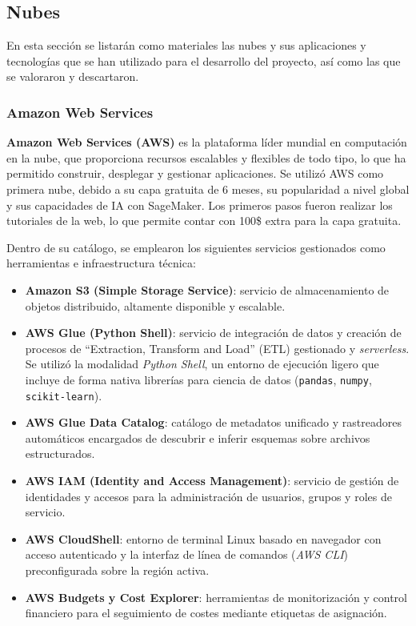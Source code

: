 \subsection{Nubes}

En esta sección se listarán como materiales las nubes y sus aplicaciones y tecnologías que se han utilizado para el desarrollo del proyecto, así como las que se valoraron y descartaron.

\subsubsection{Amazon Web Services}

\textbf{Amazon Web Services (AWS)} es la plataforma líder mundial en computación en la nube, que proporciona recursos escalables y flexibles de todo tipo, lo que ha permitido construir, desplegar y gestionar aplicaciones. Se utilizó AWS como primera nube, debido a su capa gratuita de 6 meses, su popularidad a nivel global y sus capacidades de IA con SageMaker. Los primeros pasos fueron realizar los tutoriales de la web, lo que permite contar con 100\$ extra para la capa gratuita.

Dentro de su catálogo, se emplearon los siguientes servicios gestionados como herramientas e infraestructura técnica:

\begin{itemize}
	\item \textbf{Amazon S3 (Simple Storage Service)}: servicio de almacenamiento de objetos distribuido, altamente disponible y escalable.
	\item \textbf{AWS Glue (Python Shell)}: servicio de integración de datos y creación de procesos de ``Extraction, Transform and Load'' (ETL) gestionado y \textit{serverless}. Se utilizó la modalidad \textit{Python Shell}, un entorno de ejecución ligero que incluye de forma nativa librerías para ciencia de datos (\texttt{pandas}, \texttt{numpy}, \texttt{scikit-learn}).
	\item \textbf{AWS Glue Data Catalog}: catálogo de metadatos unificado y rastreadores automáticos encargados de descubrir e inferir esquemas sobre archivos estructurados.
	\item \textbf{AWS IAM (Identity and Access Management)}: servicio de gestión de identidades y accesos para la administración de usuarios, grupos y roles de servicio.
	\item \textbf{AWS CloudShell}: entorno de terminal Linux basado en navegador con acceso autenticado y la interfaz de línea de comandos (\textit{AWS CLI}) preconfigurada sobre la región activa.
	\item \textbf{AWS Budgets y Cost Explorer}: herramientas de monitorización y control financiero para el seguimiento de costes mediante etiquetas de asignación.
\end{itemize}


